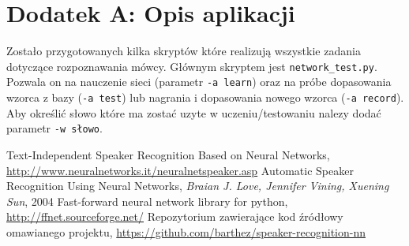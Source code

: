 \documentclass[journal]{IEEEtran}
\begin{document}
\section{Dodatek A: Opis aplikacji}

Zostało przygotowanych kilka skryptów które realizują wszystkie zadania
dotyczące rozpoznawania mówcy. Głównym skryptem jest \verb|network_test.py|.
Pozwala on na nauczenie sieci (parametr \verb|-a learn|) oraz na próbe
dopasowania wzorca z bazy (\verb|-a test|) lub nagrania i dopasowania nowego
wzorca (\verb|-a record|). Aby określić słowo które ma zostać uzyte w
uczeniu/testowaniu nalezy dodać parametr \verb|-w słowo|.


\begin{thebibliography}{123}
    Text-Independent Speaker Recognition Based on Neural Networks,
        \url{http://www.neuralnetworks.it/neuralnetspeaker.asp}
    Automatic Speaker Recognition Using Neural Networks, \emph{Braian
        J. Love, Jennifer Vining, Xuening Sun}, 2004
    Fast-forward neural network library for python,
        \url{http://ffnet.sourceforge.net/}
    Repozytorium zawierające kod źródłowy omawianego projektu,
        \url{https://github.com/barthez/speaker-recognition-nn}
\end{thebibliography}
\end{document}
